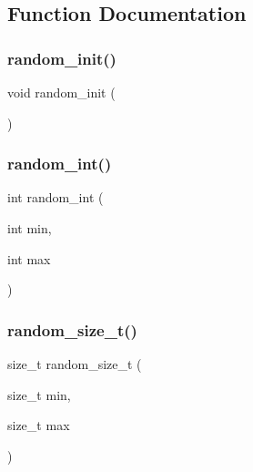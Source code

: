 \subsection{Function Documentation}
\mbox{\label{random_8c_af2e80b8de6ec1840dac4668ca5a38606}} 
\subsubsection{random\+\_\+init()}
{\footnotesize\ttfamily void random\+\_\+init (\begin{DoxyParamCaption}{ }\end{DoxyParamCaption})\hspace{0.3cm}{\ttfamily [inline]}}

\mbox{\label{random_8c_ad7954e6a1b9ea073c7bc894dc5af85a9}} 
\subsubsection{random\+\_\+int()}
{\footnotesize\ttfamily int random\+\_\+int (\begin{DoxyParamCaption}\item[{int}]{min,  }\item[{int}]{max }\end{DoxyParamCaption})\hspace{0.3cm}{\ttfamily [inline]}}

\mbox{\label{random_8c_a9911fe7c3f3108164ffac97c8d815142}} 
\subsubsection{random\+\_\+size\+\_\+t()}
{\footnotesize\ttfamily size\+\_\+t random\+\_\+size\+\_\+t (\begin{DoxyParamCaption}\item[{size\+\_\+t}]{min,  }\item[{size\+\_\+t}]{max }\end{DoxyParamCaption})\hspace{0.3cm}{\ttfamily [inline]}}

